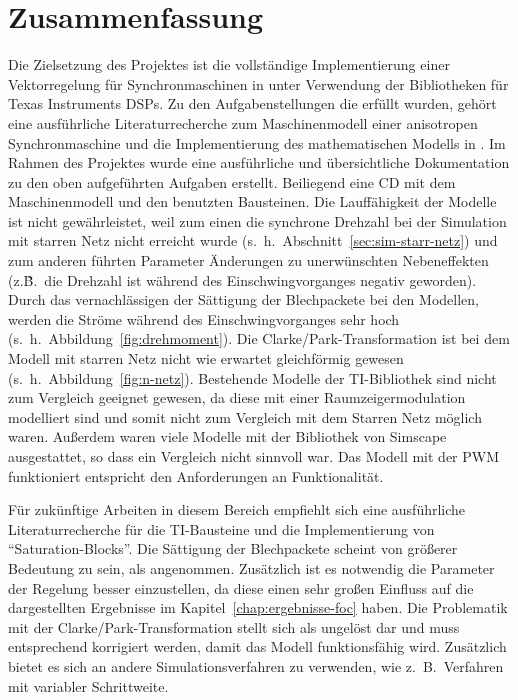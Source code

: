 
\chapter{Zusammenfassung}
\label{cha:zusammenfassung}

Die Zielsetzung des Projektes ist die vollständige Implementierung einer Vektorregelung für Synchronmaschinen in  unter Verwendung der Bibliotheken für Texas Instruments DSPs.
Zu den Aufgabenstellungen die erfüllt wurden, gehört eine ausführliche Literaturrecherche zum Maschinenmodell einer anisotropen Synchronmaschine und die Implementierung des mathematischen Modells in .
Im Rahmen des Projektes wurde eine ausführliche und übersichtliche Dokumentation zu den oben aufgeführten Aufgaben erstellt.
Beiliegend eine CD mit dem Maschinenmodell und den benutzten  Bausteinen.
Die Lauffähigkeit der Modelle ist nicht gewährleistet, weil zum einen die synchrone Drehzahl bei der Simulation mit starren Netz nicht erreicht wurde (s.~h.~Abschnitt~\ref{sec:sim-starr-netz}) und zum anderen führten Parameter Änderungen zu unerwünschten Nebeneffekten (z.\~B.\ die Drehzahl ist während des Einschwingvorganges negativ geworden).
Durch das vernachlässigen der Sättigung der Blechpackete bei den Modellen, werden die Ströme während des Einschwingvorganges sehr hoch (s.~h.~Abbildung~\ref{fig:drehmoment}).
Die Clarke/Park-Transformation ist bei dem Modell mit starren Netz nicht wie erwartet gleichförmig gewesen (s.~h.~Abbildung~\ref{fig:n-netz}).
Bestehende Modelle der TI-Bibliothek sind nicht zum Vergleich geeignet gewesen, da diese mit einer Raumzeigermodulation modelliert sind und somit nicht zum Vergleich mit dem Starren Netz möglich waren.
Außerdem waren viele Modelle mit der Bibliothek von Simscape ausgestattet, so dass ein Vergleich nicht sinnvoll war.
Das Modell mit der PWM funktioniert entspricht den Anforderungen an Funktionalität.

Für zukünftige Arbeiten in diesem Bereich empfiehlt sich eine ausführliche Literaturrecherche für die TI-Bausteine und die Implementierung von \enquote{Saturation-Blocks}.
Die Sättigung der Blechpackete scheint von größerer Bedeutung zu sein, als angenommen.
Zusätzlich ist es notwendig die Parameter der Regelung besser einzustellen, da diese einen sehr großen Einfluss auf die dargestellten Ergebnisse im Kapitel~\ref{chap:ergebnisse-foc} haben.
Die Problematik mit der Clarke/Park-Transformation stellt sich als ungelöst dar und muss entsprechend korrigiert werden, damit das Modell funktionsfähig wird.
Zusätzlich bietet es sich an andere Simulationsverfahren zu verwenden, wie z.\ B.\ Verfahren mit variabler Schrittweite.



